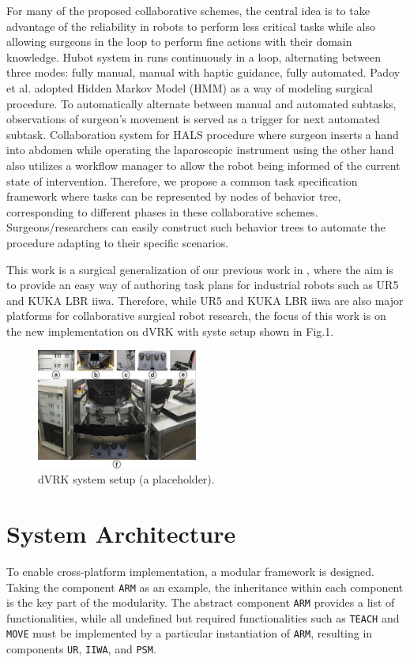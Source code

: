 \documentclass[letterpaper, 10 pt, conference]{ieeeconf}
\begin{document}
For many of the proposed collaborative schemes, the central idea is to take advantage of the reliability in robots to perform less critical tasks while also allowing surgeons in the loop to perform fine actions with their domain knowledge. Hubot system in \cite{berthet2016hubot} runs continuously in a loop, alternating between three modes: fully manual, manual with haptic guidance, fully automated. Padoy et al. \cite{padoy2011human} adopted Hidden Markov Model (HMM) as a way of modeling surgical procedure. To automatically alternate between manual and automated subtasks, observations of surgeon’s movement is served as a trigger for next automated subtask. Collaboration system for HALS procedure \cite{bauzano2016collaborative} where surgeon inserts a hand into abdomen while operating the laparoscopic instrument using the other hand also utilizes a workflow manager to allow the robot being informed of the current state of intervention. Therefore, we propose a common task specification framework where tasks can be represented by nodes of behavior tree, corresponding to different phases in these collaborative schemes. Surgeons/researchers can easily construct such  behavior trees to automate the procedure adapting to their specific scenarios. 

This work is a surgical generalization of our previous work in \cite{paxton2017costar}, where the aim is to provide an easy way of authoring task plans for industrial robots such as UR5 and KUKA LBR iiwa. Therefore, while UR5 and KUKA LBR iiwa are also major platforms for collaborative surgical robot research, the focus of this work is on the new implementation on dVRK with syste setup shown in Fig.1. 


\begin{figure}[bt]
\centering
\includegraphics[width=150pt]{dvrk.jpg}
\caption{dVRK system setup (a placeholder).}
\label{fig:dvrk}
\end{figure}


\section{System Architecture}
To enable cross-platform implementation, a modular framework is designed. Taking the component \texttt{ARM} as an example, the inheritance within each component is the key part of the modularity. The abstract component \texttt{ARM} provides a list of functionalities, while all undefined but required functionalities such as \texttt{TEACH} and \texttt{MOVE} must be implemented by a particular instantiation of \texttt{ARM}, resulting in components \texttt{UR}, \texttt{IIWA}, and \texttt{PSM}. 
\end{document}
